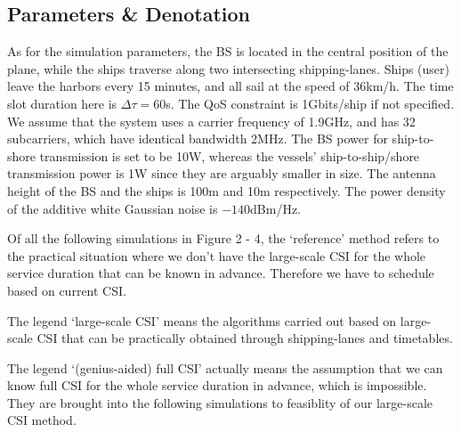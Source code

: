 \documentclass[conference]{IEEEtran}
\begin{document}
\subsection{Parameters \& Denotation}




As for the simulation parameters, the BS is located in the central position of the plane, while the ships traverse along two intersecting shipping-lanes.
Ships (user) leave the harbors every 15 minutes, and all sail at the speed of 36km/h. The time slot duration here is $\Delta \tau = 60$s. The QoS constraint is 1Gbits/ship if not specified. We assume that the system uses a carrier frequency of 1.9GHz, and has 32 subcarriers, which have identical bandwidth 2MHz. The BS power for ship-to-shore transmission is set to be 10W, whereas the vessels' ship-to-ship/shore transmission power is 1W since they are arguably smaller in size. The antenna height of the BS and the ships is 100m and 10m respectively. The power density of the additive white Gaussian noise is ${-140}$dBm/Hz. 

Of all the following simulations in Figure 2 - 4, the `reference' method refers to the practical situation where we don't have the large-scale CSI for the whole service duration that can be known in advance. Therefore we have to schedule based on current CSI. 

The legend `large-scale CSI' means the algorithms carried out based on large-scale CSI that can be practically obtained through shipping-lanes and timetables. 

The legend `(genius-aided) full CSI' actually means the assumption that we can know full CSI for the whole service duration in advance, which is impossible. They are brought into the following simulations to feasiblity of our large-scale CSI method. 
\end{document}
